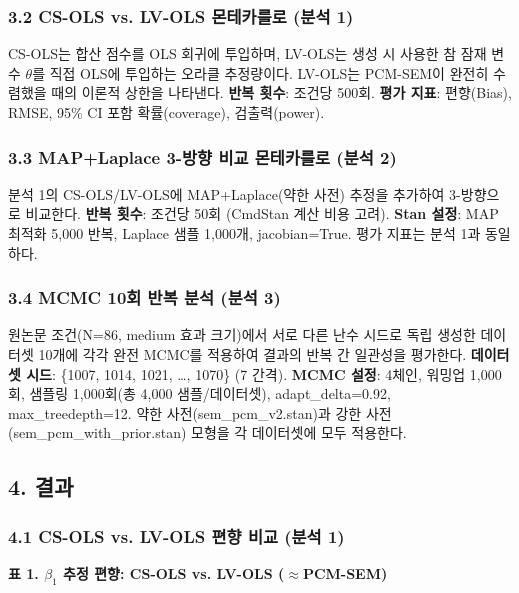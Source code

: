 \documentclass[a4paper,10pt]{oblivoir}
\begin{document}
\subsubsection{3.2 CS-OLS vs. LV-OLS 몬테카를로 (분석 1)}

CS-OLS는 합산 점수를 OLS 회귀에 투입하며, LV-OLS는 생성 시 사용한 참 잠재 변수 $\theta$를 직접 OLS에 투입하는 오라클 추정량이다. LV-OLS는 PCM-SEM이 완전히 수렴했을 때의 이론적 상한을 나타낸다. \textbf{반복 횟수}: 조건당 500회. \textbf{평가 지표}: 편향(Bias), RMSE, 95\% CI 포함 확률(coverage), 검출력(power).

\subsubsection{3.3 MAP+Laplace 3-방향 비교 몬테카를로 (분석 2)}

분석 1의 CS-OLS/LV-OLS에 MAP+Laplace(약한 사전) 추정을 추가하여 3-방향으로 비교한다. \textbf{반복 횟수}: 조건당 50회 (CmdStan 계산 비용 고려). \textbf{Stan 설정}: MAP 최적화 5,000 반복, Laplace 샘플 1,000개, jacobian=True. 평가 지표는 분석 1과 동일하다.

\subsubsection{3.4 MCMC 10회 반복 분석 (분석 3)}

원논문 조건(N=86, medium 효과 크기)에서 서로 다른 난수 시드로 독립 생성한 데이터셋 10개에 각각 완전 MCMC를 적용하여 결과의 반복 간 일관성을 평가한다. \textbf{데이터셋 시드}: \{1007, 1014, 1021, \ldots, 1070\} (7 간격). \textbf{MCMC 설정}: 4체인, 워밍업 1,000회, 샘플링 1,000회(총 4,000 샘플/데이터셋), adapt\_delta=0.92, max\_treedepth=12. 약한 사전(sem\_pcm\_v2.stan)과 강한 사전(sem\_pcm\_with\_prior.stan) 모형을 각 데이터셋에 모두 적용한다.


\subsection{4. 결과}

\subsubsection{4.1 CS-OLS vs. LV-OLS 편향 비교 (분석 1)}

\textbf{표 1. $\beta_1$ 추정 편향: CS-OLS vs. LV-OLS (\ensuremath{\approx}PCM-SEM)}
\end{document}
